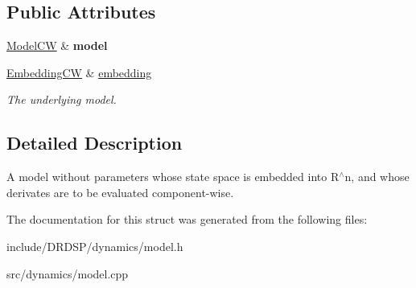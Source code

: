 \subsection*{Public Attributes}
\begin{DoxyCompactItemize}
\item 
\hypertarget{struct_d_r_d_s_p_1_1_model_embedded_c_w_a8f582175d25ab090a16ac5ca44c3424e}{\hyperlink{struct_d_r_d_s_p_1_1_model_c_w}{Model\-C\-W} \& {\bfseries model}}\label{struct_d_r_d_s_p_1_1_model_embedded_c_w_a8f582175d25ab090a16ac5ca44c3424e}

\item 
\hypertarget{struct_d_r_d_s_p_1_1_model_embedded_c_w_abd957dbddb85f3625f5029604a88b5a8}{\hyperlink{struct_d_r_d_s_p_1_1_embedding_c_w}{Embedding\-C\-W} \& \hyperlink{struct_d_r_d_s_p_1_1_model_embedded_c_w_abd957dbddb85f3625f5029604a88b5a8}{embedding}}\label{struct_d_r_d_s_p_1_1_model_embedded_c_w_abd957dbddb85f3625f5029604a88b5a8}

\begin{DoxyCompactList}\small\item\em The underlying model. \end{DoxyCompactList}\end{DoxyCompactItemize}


\subsection{Detailed Description}
A model without parameters whose state space is embedded into R$^\wedge$n, and whose derivates are to be evaluated component-\/wise. 

The documentation for this struct was generated from the following files\-:\begin{DoxyCompactItemize}
\item 
include/\-D\-R\-D\-S\-P/dynamics/model.\-h\item 
src/dynamics/model.\-cpp\end{DoxyCompactItemize}
